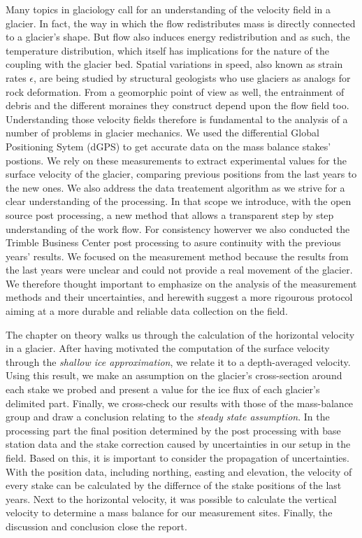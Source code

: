 Many topics in glaciology call for an understanding of the velocity field in a glacier. 
In fact, the way in which the flow redistributes mass is directly connected to a glacier's shape. But flow also induces energy redistribution and as such, the temperature distribution, which itself has implications for the nature of the coupling with the glacier bed. 
Spatial variations in speed, also known as strain rates $\epsilon$, are being studied by structural geologists who use glaciers as analogs for rock deformation. 
From a geomorphic point of view as well, the entrainment of debris and the different moraines they construct depend upon the flow field too. 
Understanding those velocity fields therefore is fundamental to the analysis of a number of problems in glacier mechanics.
We used the differential Global Positioning Sytem (dGPS) to get accurate data on the mass balance stakes' postions.
We rely on these measurements to extract experimental values for the surface velocity of the glacier, comparing previous positions from the last years to the new ones.
We also address the data treatement algorithm as we strive for a clear understanding of the processing.
In that scope we introduce, with the open source post processing, a new method that allows a transparent step by step understanding of the work flow.
For consistency howerver we also conducted the Trimble Business Center post processing to asure continuity with the previous years' results. 
We focused on the measurement method because the results from the last years were unclear and could not provide a real movement of the glacier.
We therefore thought important to emphasize on the analysis of the measurement methods and their uncertainties, and herewith suggest a more rigourous protocol aiming at a more durable and reliable data collection on the field.
\medskip 

The chapter on theory walks us through the calculation of the horizontal velocity in a glacier. After having motivated the computation of the surface velocity through the \textit{shallow ice approximation}, we relate it to a depth-averaged velocity. Using this result, we make an assumption on the glacier's cross-section around each stake we probed and present a value for the ice flux of each glacier's delimited part. Finally, we cross-check our results with those of the mass-balance group and draw a conclusion relating to the \textit{steady state assumption}.
In the processing part the final position determined by the post processing with base station data and the stake correction caused by uncertainties in our setup in the field.
Based on this, it is important to consider the propagation of uncertainties.
With the position data, including northing, easting and elevation, the velocity of every stake can be calculated by the differnce of the stake positions of the last years.
Next to the horizontal velocity, it was possible to calculate the vertical velocity to determine a mass balance for our measurement sites. 
Finally, the discussion and conclusion close the report.
